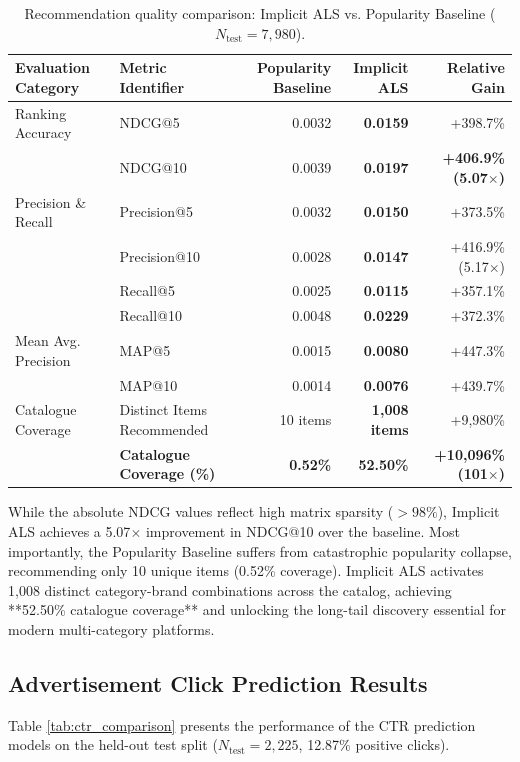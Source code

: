 \documentclass[10pt,a4paper,twoside]{article}
\begin{document}
\begin{table}[ht]
\centering
\small
\caption{Recommendation quality comparison: Implicit ALS vs. Popularity Baseline ($N_{\text{test}} = 7,980$).}
\label{tab:als_results}
\begin{tabular}{llrrr}
\toprule
\textbf{Evaluation Category} & \textbf{Metric Identifier} & \textbf{Popularity Baseline} & \textbf{Implicit ALS} & \textbf{Relative Gain} \\
\midrule
Ranking Accuracy & NDCG@5 & 0.0032 & \textbf{0.0159} & +398.7\% \\
                 & NDCG@10 & 0.0039 & \textbf{0.0197} & \textbf{+406.9\% (5.07$\times$)} \\
Precision \& Recall & Precision@5 & 0.0032 & \textbf{0.0150} & +373.5\% \\
                   & Precision@10 & 0.0028 & \textbf{0.0147} & +416.9\% (5.17$\times$) \\
                   & Recall@5 & 0.0025 & \textbf{0.0115} & +357.1\% \\
                   & Recall@10 & 0.0048 & \textbf{0.0229} & +372.3\% \\
Mean Avg. Precision & MAP@5 & 0.0015 & \textbf{0.0080} & +447.3\% \\
                    & MAP@10 & 0.0014 & \textbf{0.0076} & +439.7\% \\
Catalogue Coverage & Distinct Items Recommended & 10 items & \textbf{1,008 items} & +9,980\% \\
                   & \textbf{Catalogue Coverage (\%)} & \textbf{0.52\%} & \textbf{52.50\%} & \textbf{+10,096\% (101$\times$)} \\
\bottomrule
\end{tabular}
\end{table}

While the absolute NDCG values reflect high matrix sparsity ($> 98\%$), Implicit ALS achieves a 5.07$\times$ improvement in NDCG@10 over the baseline. Most importantly, the Popularity Baseline suffers from catastrophic popularity collapse, recommending only 10 unique items (0.52\% coverage). Implicit ALS activates 1,008 distinct category-brand combinations across the catalog, achieving **52.50\% catalogue coverage** and unlocking the long-tail discovery essential for modern multi-category platforms.

\subsection{Advertisement Click Prediction Results}
Table \ref{tab:ctr_comparison} presents the performance of the CTR prediction models on the held-out test split ($N_{\text{test}} = 2,225$, 12.87\% positive clicks).
\end{document}
